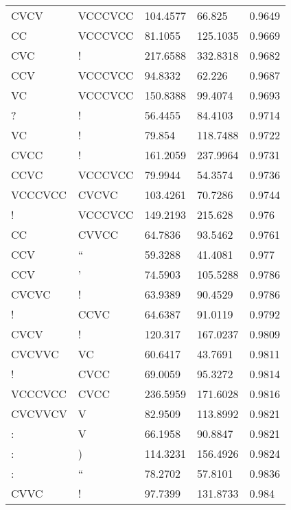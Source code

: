 \begin{table}[H]
\begin{tabular}{@{}lllll@{}}
		CVCV    & VCCCVCC & 104.4577      & 66.825          & 0.9649  \\
		CC      & VCCCVCC & 81.1055       & 125.1035        & 0.9669  \\
		CVC     & !       & 217.6588      & 332.8318        & 0.9682  \\
		CCV     & VCCCVCC & 94.8332       & 62.226          & 0.9687  \\
		VC      & VCCCVCC & 150.8388      & 99.4074         & 0.9693  \\
		?       & !       & 56.4455       & 84.4103         & 0.9714  \\
		VC      & !       & 79.854        & 118.7488        & 0.9722  \\
		CVCC    & !       & 161.2059      & 237.9964        & 0.9731  \\
		CCVC    & VCCCVCC & 79.9944       & 54.3574         & 0.9736  \\
		VCCCVCC & CVCVC   & 103.4261      & 70.7286         & 0.9744  \\
		!       & VCCCVCC & 149.2193      & 215.628         & 0.976   \\
		CC      & CVVCC   & 64.7836       & 93.5462         & 0.9761  \\
		CCV     & ``      & 59.3288       & 41.4081         & 0.977   \\
		CCV     & '       & 74.5903       & 105.5288        & 0.9786  \\
		CVCVC   & !       & 63.9389       & 90.4529         & 0.9786  \\
		!       & CCVC    & 64.6387       & 91.0119         & 0.9792  \\
		CVCV    & !       & 120.317       & 167.0237        & 0.9809  \\
		CVCVVC  & VC      & 60.6417       & 43.7691         & 0.9811  \\
		!       & CVCC    & 69.0059       & 95.3272         & 0.9814  \\
		VCCCVCC & CVCC    & 236.5959      & 171.6028        & 0.9816  \\
		CVCVVCV & V       & 82.9509       & 113.8992        & 0.9821  \\
		:       & V       & 66.1958       & 90.8847         & 0.9821  \\
		:       & )       & 114.3231      & 156.4926        & 0.9824  \\
		:       & ``      & 78.2702       & 57.8101         & 0.9836  \\
		CVVC    & !       & 97.7399       & 131.8733        & 0.984   \\

\end{tabular}
\end{table}
